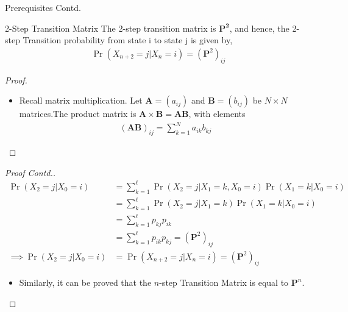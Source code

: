 \documentclass{beamer}
\renewcommand{\vec}[1]{\mathbf{#1}}
\providecommand{\pr}[1]{\ensuremath{\Pr\left(#1\right)}}
\let\vec\mathbf
\begin{document}
\begin{frame}{Prerequisites Contd.}
    \begin{block}{2-Step Transition Matrix}
        The 2-step transition matrix is $\vec{P^{2}}$, and hence, the 2-step Transition probability from state i to state j is given by,
        \begin{align}
            \pr{X_{n+2}=j|X_{n}=i}=(\vec P^{2})_{ij}
        \end{align}
    \end{block}
    \begin{proof}
         \begin{itemize}
        \item Recall matrix multiplication. Let $\vec A = (a_{ij} )$ and $\vec B = (b_{ij})$ be $N \times N$ matrices.The product matrix is $\vec A \times \vec B = \vec A\vec B$, with elements
        \begin{align}
            (\vec A\vec B)_{ij}= \sum\limits_{k=1}^N a_{ik}b_{kj}
        \end{align}
        \end{itemize}   
    \end{proof}
    \end{frame}
    \begin{frame}
\begin{proof}[Proof Contd.]
        \vspace{-6mm}
        \begin{align}
            \pr{X_{2}=j | X_0=i}&=\sum\limits_{k=1}^\ell \pr{X_{2}=j | X_{1}=k, X_0=i}\pr{X_{1}=k | X_0=i}\\
            &=\sum\limits_{k=1}^\ell \pr{X_{2}=j | X_{1}=k}\pr{X_{1}=k | X_0=i}\\
            &=\sum\limits_{k=1}^\ell p_{kj}p_{ik}\\
            &=\sum\limits_{k=1}^\ell p_{ik}p_{kj}       =(\vec P^2)_{ij}\\
          \implies  \pr{X_{2}=j | X_0=i}&=\pr{X_{n+2}=j | X_n=i}=(\vec P^2)_{ij}
        \end{align}
        \vspace{-8mm}
        \begin{itemize}
            \item Similarly, it can be proved that the $n$-step Transition Matrix is equal to $\vec P^n$.
        \end{itemize}
    \end{proof}
\end{frame}
\end{document}
